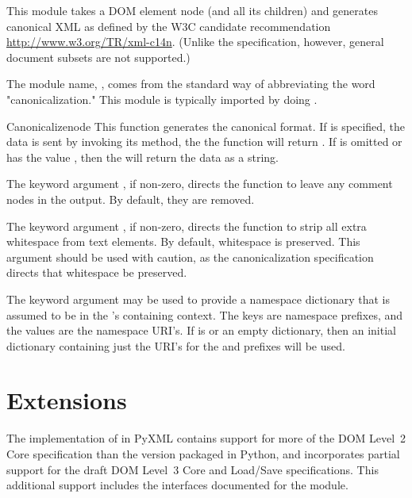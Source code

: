 \documentclass{howto}
\begin{document}
This module takes a DOM element node (and all its children) and generates
canonical XML as defined by the W3C candidate recommendation
\url{http://www.w3.org/TR/xml-c14n}.
(Unlike the specification, however, general document subsets are not
supported.)

The module name, , comes from the standard way of abbreviating
the word "canonicalization."
This module is typically imported by doing
.

\begin{funcdesc}{Canonicalize}{node}
This function generates the canonical format.
If  is specified, the data is sent by invoking its
 method, the the function will return .
If  is omitted or has the value , then
the  will return the data as a string.

The keyword argument , if non-zero, directs the function
to leave any comment nodes in the output. By default, they are removed.

The keyword argument , if non-zero, directs the function
to strip all extra whitespace from text elements.
By default, whitespace is preserved.
This argument should be used with caution, as the canonicalization
specification directs that whitespace be preserved.

The keyword argument  may be used to provide a namespace
dictionary that is assumed to be in the 's containing
context.
The keys are namespace prefixes, and the values are the namespace URI's.
If  is  or an empty dictionary, then an initial
dictionary containing just the URI's for the  and 
prefixes will be used.
\end{funcdesc}


\section{ Extensions}

The implementation of  in PyXML contains
support for more of the DOM Level~2 Core specification than the
version packaged in Python, and incorporates partial support for the
draft DOM Level~3 Core and Load/Save specifications.  This additional
support includes the interfaces documented for the
 module.
\end{document}
